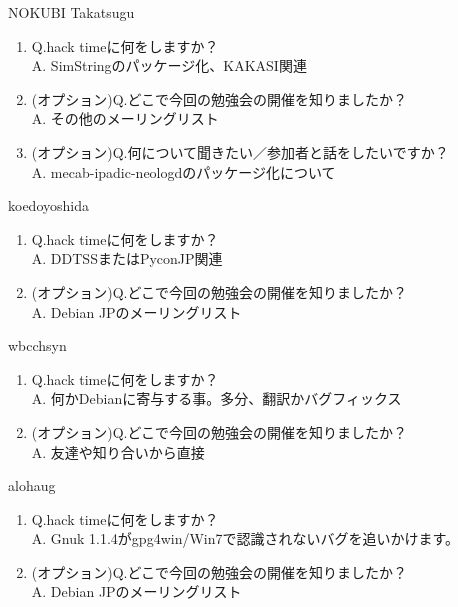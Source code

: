 \begin{prework}{ NOKUBI Takatsugu }
  \begin{enumerate}
  \item Q.hack timeに何をしますか？\\
    A. SimStringのパッケージ化、KAKASI関連
  \item (オプション)Q.どこで今回の勉強会の開催を知りましたか？\\
    A. その他のメーリングリスト
  \item (オプション)Q.何について聞きたい／参加者と話をしたいですか？\\
    A. mecab-ipadic-neologdのパッケージ化について
  \end{enumerate}
\end{prework}

\begin{prework}{ koedoyoshida }
  \begin{enumerate}
  \item Q.hack timeに何をしますか？\\
    A. DDTSSまたはPyconJP関連
  \item (オプション)Q.どこで今回の勉強会の開催を知りましたか？\\
    A. Debian JPのメーリングリスト
  \end{enumerate}
\end{prework}

\begin{prework}{ wbcchsyn }
  \begin{enumerate}
  \item Q.hack timeに何をしますか？\\
    A. 何かDebianに寄与する事。多分、翻訳かバグフィックス
  \item (オプション)Q.どこで今回の勉強会の開催を知りましたか？\\
    A. 友達や知り合いから直接
  \end{enumerate}
\end{prework}

\begin{prework}{ alohaug }
  \begin{enumerate}
  \item Q.hack timeに何をしますか？\\
    A. Gnuk 1.1.4がgpg4win/Win7で認識されないバグを追いかけます。
  \item (オプション)Q.どこで今回の勉強会の開催を知りましたか？\\
    A. Debian JPのメーリングリスト
  \end{enumerate}
\end{prework}


